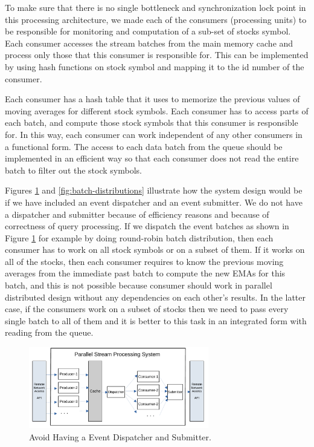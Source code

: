 To make sure that there is no single bottleneck and synchronization lock point in this processing architecture, we made each of the consumers
(processing units) to be responsible for monitoring and computation of a sub-set of stocks symbol. Each consumer accesses the stream batches from 
the main memory cache and process only those that this consumer is responsible for. This can be implemented by using hash functions on 
stock symbol and mapping it to the id number of the consumer. 

Each consumer has a hash table that it uses to memorize the previous values of moving averages for different stock symbols.  
Each consumer has to access parts of each batch, and compute those stock symbols that this consumer is responsible for. In this way, each consumer can work 
independent of any other consumers in a functional form. The access to each data batch from the queue should be implemented in an efficient way so that each 
consumer does not read the entire batch to filter out the stock symbols. 



Figures \ref{fig:parallel-srream-processing} and \ref{fig:batch-distributions} illustrate how the system design would be if we have included an event dispatcher
and an event submitter. We do not have a dispatcher and submitter because of efficiency reasons and because of correctness of query processing. 
If we dispatch the event batches as shown in Figure \ref{fig:parallel-srream-processing} for example by doing round-robin batch distribution, then each 
consumer has to work on all stock symbols or on a subset of them. If it works on all of the stocks, then each consumer requires to know the previous 
moving averages from the immediate past batch to compute the new EMAs for this batch, and this is not possible because 
consumer should work in parallel distributed design without any dependencies on each other's results. In the latter case, if the consumers 
work on a subset of stocks then we need to pass every single batch to all of them and it is better 
to this task in an integrated form with reading from the queue.



\begin{figure}[]
    \begin{center}
        \includegraphics[width=0.7\textwidth]{./images/Parallel-Stream-Processing-System}
        \caption{Avoid Having a Event Dispatcher and Submitter.}
        \label{fig:parallel-srream-processing}
    \end{center}
\end{figure}


